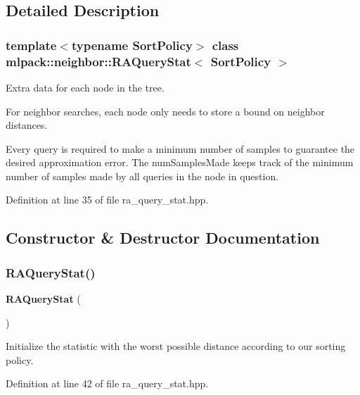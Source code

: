 \subsection{Detailed Description}
\subsubsection*{template$<$typename Sort\+Policy$>$\newline
class mlpack\+::neighbor\+::\+R\+A\+Query\+Stat$<$ Sort\+Policy $>$}

Extra data for each node in the tree. 

For neighbor searches, each node only needs to store a bound on neighbor distances.

Every query is required to make a minimum number of samples to guarantee the desired approximation error. The \textquotesingle{}num\+Samples\+Made\textquotesingle{} keeps track of the minimum number of samples made by all queries in the node in question. 

Definition at line 35 of file ra\+\_\+query\+\_\+stat.\+hpp.



\subsection{Constructor \& Destructor Documentation}
\mbox{\label{classmlpack_1_1neighbor_1_1RAQueryStat_a098a188470046d5d6616fe581f30a5ad}} 
\subsubsection{R\+A\+Query\+Stat()\hspace{0.1cm}{\footnotesize\ttfamily [1/2]}}
{\footnotesize\ttfamily \textbf{ R\+A\+Query\+Stat} (\begin{DoxyParamCaption}{ }\end{DoxyParamCaption})\hspace{0.3cm}{\ttfamily [inline]}}



Initialize the statistic with the worst possible distance according to our sorting policy. 



Definition at line 42 of file ra\+\_\+query\+\_\+stat.\+hpp.

